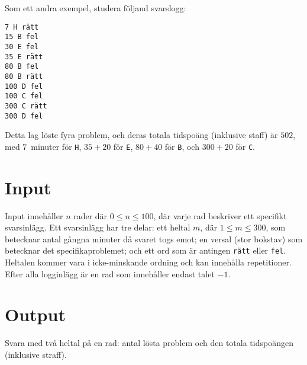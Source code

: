 Som ett andra exempel, studera följand svarslogg:%

\vspace{-12pt}
\begin{verbatim}
7 H rätt
15 B fel
30 E fel
35 E rätt
80 B fel
80 B rätt
100 D fel
100 C fel
300 C rätt
300 D fel
\end{verbatim}
\vspace{-12pt}

Detta lag löste fyra problem, och deras totala tidspoäng (inklusive staff)
är $502$, med $7$~minuter för {\tt H}, $35+20$ för {\tt E},
$80+40$ för {\tt B}, och $300+20$ för {\tt C}.

\section*{Input}

Input innehåller $n$ rader där $0 \leq n \leq 100$, där varje rad
beskriver ett specifikt svarsinlägg. Ett svarsinlägg har tre delar:
ett heltal $m$, där $1 \leq m \leq 300$, som betecknar antal gångna minuter
då svaret togs emot; en versal (stor bokstav) som betecknar det
specifikaproblemet; och ett ord som är antingen {\tt rätt} eller {\tt fel}.
Heltalen kommer vara i icke-minskande ordning och kan innehålla
repetitioner. Efter alla logginlägg är en rad som innehåller endast
talet $-1$.

\section*{Output}

Svara med två heltal på en rad: antal lösta problem och den totala
tidspoängen (inklusive straff).
